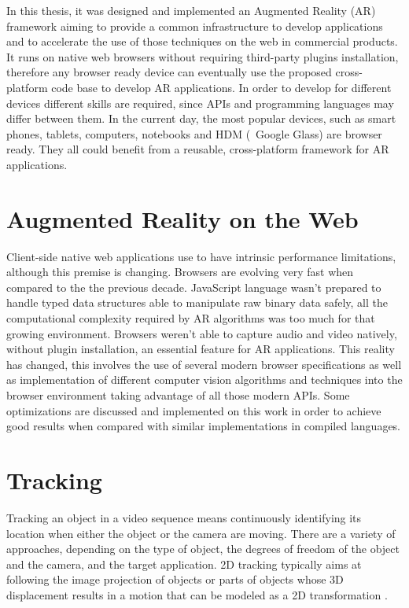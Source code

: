 In this thesis, it was designed and implemented an Augmented Reality (AR) framework aiming to provide a common infrastructure to develop applications and to accelerate the use of those techniques on the web in commercial products. It runs on native web browsers without requiring third-party plugins installation, therefore any browser ready device can eventually use the proposed cross-platform code base to develop AR applications. In order to develop for different devices different skills are required, since APIs and programming languages may differ between them. In the current day, the most popular devices, such as smart phones, tablets, computers, notebooks and HDM (\ie\ Google Glass) are browser ready. They all could benefit from a reusable, cross-platform framework for AR applications.


\section{Augmented Reality on the Web} %
\label{sec:basic_concepts:augmented_reality_on_the_web}

Client-side native web applications use to have intrinsic performance limitations, although this premise is changing. Browsers are evolving very fast when compared to the the previous decade. JavaScript language wasn't prepared to handle typed data structures able to manipulate raw binary data safely, all the computational complexity required by AR algorithms was too much for that growing environment. Browsers weren't able to capture audio and video natively, without plugin installation, an essential feature for AR applications. This reality has changed, this involves the use of several modern browser specifications as well as implementation of different computer vision algorithms and techniques into the browser environment taking advantage of all those modern APIs. Some optimizations are discussed and implemented on this work in order to achieve good results when compared with similar implementations in compiled languages.


\section{Tracking} %
\label{sec:basic_concepts:augmented_reality_tracking}

Tracking an object in a video sequence means continuously identifying its location when either the object or the camera are moving. There are a variety of approaches, depending on the type of object, the degrees of freedom of the object and the camera, and the target application.
2D tracking typically aims at following the image projection of objects or parts of objects whose 3D displacement results in a motion that can be modeled as a 2D transformation \cite{Lepetit2005}.

